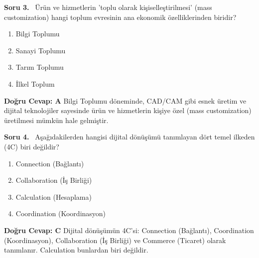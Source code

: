 \documentclass[11pt,a4paper,openany]{book}
\begin{document}
\needspace{5cm}
\vspace{8pt}
\noindent\textbf{\large\sffamily Soru 3.} \ Ürün ve hizmetlerin 'toplu olarak kişiselleştirilmesi' (mass customization) hangi toplum evresinin ana ekonomik özelliklerinden biridir?
\begin{enumerate}[label=\Alph*), leftmargin=25pt, topsep=4pt, itemsep=2pt]
    \item Bilgi Toplumu
    \item Sanayi Toplumu
    \item Tarım Toplumu
    \item İlkel Toplum
\end{enumerate}
\vspace{4pt}
\begin{tcolorbox}[title=Cevap ve Açıklama, colback=gray!3!white, colframe=primarycolor!90!black, arc=2mm, fonttitle=\bfseries\sffamily, top=6pt, bottom=6pt]
    \textbf{Doğru Cevap: A}
    \vspace{2pt}
    Bilgi Toplumu döneminde, CAD/CAM gibi esnek üretim ve dijital teknolojiler sayesinde ürün ve hizmetlerin kişiye özel (mass customization) üretilmesi mümkün hale gelmiştir.
\end{tcolorbox}
\vspace{10pt}

\needspace{5cm}
\vspace{8pt}
\noindent\textbf{\large\sffamily Soru 4.} \ Aşağıdakilerden hangisi dijital dönüşümü tanımlayan dört temel ilkeden (4C) biri değildir?
\begin{enumerate}[label=\Alph*), leftmargin=25pt, topsep=4pt, itemsep=2pt]
    \item Connection (Bağlantı)
    \item Collaboration (İş Birliği)
    \item Calculation (Hesaplama)
    \item Coordination (Koordinasyon)
\end{enumerate}
\vspace{4pt}
\begin{tcolorbox}[title=Cevap ve Açıklama, colback=gray!3!white, colframe=primarycolor!90!black, arc=2mm, fonttitle=\bfseries\sffamily, top=6pt, bottom=6pt]
    \textbf{Doğru Cevap: C}
    \vspace{2pt}
    Dijital dönüşümün 4C'si: Connection (Bağlantı), Coordination (Koordinasyon), Collaboration (İş Birliği) ve Commerce (Ticaret) olarak tanımlanır. Calculation bunlardan biri değildir.
\end{tcolorbox}
\vspace{10pt}
\end{document}
